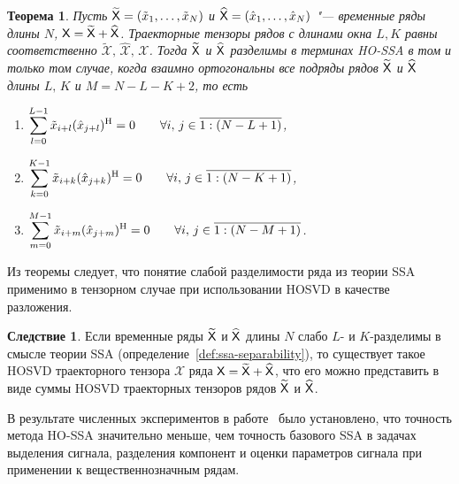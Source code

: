 \documentclass[specialist,
  substylefile = spbu.rtx,
subf,href,colorlinks=true, 12pt]{disser}
\theoremstyle{plain}
\newtheorem{theorem}{Теорема}[section]
\theoremstyle{definition}
\newtheorem*{corollary}{Следствие}
\theoremstyle{remark}
\begin{document}
\begin{theorem}
  \label{theorem:separability}
  Пусть $\widetilde{\mathsf{X}}=(\tilde{x}_1,\ldots , \tilde{x}_N)$ и
  $\widehat{\mathsf{X}}=(\hat{x}_1,\ldots , \hat{x}_N)$ "--- временные
  ряды длины $N$,
  $\mathsf{X} = \widetilde{\mathsf{X}} + \widehat{\mathsf{X}}$.
  Траекторные тензоры рядов с длинами окна $L, K$ равны
  соответственно $\widetilde{\mathcal{X}},\,
  \widehat{\mathcal{X}},\, \mathcal{X}$.
  Тогда $\widetilde{\mathsf{X}}$ и $\widehat{\mathsf{X}}$ разделимы в терминах HO-SSA
  в том и только том случае, когда взаимно ортогональны все подряды рядов
  $\widetilde{\mathsf{X}}$ и $\widehat{\mathsf{X}}$ длины $L,\, K$ и $M=N-L-K+2$, то есть
  \begin{enumerate}
    \item $\displaystyle \sum_{l=0}^{L-1}
      \tilde{x}_{i+l}(\hat{x}_{j+l})^{\mathrm{H}} = 0 \qquad \forall i,\,
      j\in\overline{1:(N-L+1)}$,
    \item $\displaystyle \sum_{k=0}^{K-1}
      \tilde{x}_{i+k}(\hat{x}_{j+k})^{\mathrm{H}} = 0 \qquad \forall i,\,
      j\in\overline{1:(N-K+1)}$,
    \item $\displaystyle \sum_{m=0}^{M-1}
      \tilde{x}_{i+m}(\hat{x}_{j+m})^{\mathrm{H}} = 0 \qquad \forall i,\,
      j\in\overline{1:(N-M+1)}$.
  \end{enumerate}
\end{theorem}

Из теоремы следует, что понятие слабой
разделимости ряда из теории SSA применимо в тензорном случае при
использовании HOSVD в качестве разложения.
\begin{corollary}
  Если временные ряды $\widetilde{\mathsf{X}}$ и $\widehat{\mathsf{X}}$ длины $N$
  слабо $L$- и $K$-разделимы
  в смысле теории SSA (определение~\ref{def:ssa-separability}),
  то существует такое HOSVD траекторного тензора $\mathcal{X}$ ряда
  $\mathsf{X}=\widetilde{\mathsf{X}} + \widehat{\mathsf{X}}$, что его можно представить в виде
  суммы HOSVD траекторных тензоров рядов $\widetilde{\mathsf{X}}$ и $\widehat{\mathsf{X}}$.
\end{corollary}

В результате численных экспериментов в работе~\cite{Thesis2024} было
установлено, что точность метода HO-SSA значительно меньше, чем
точность базового SSA в задачах выделения сигнала, разделения
компонент и оценки параметров сигнала при применении к
вещественнозначным рядам.
\end{document}
